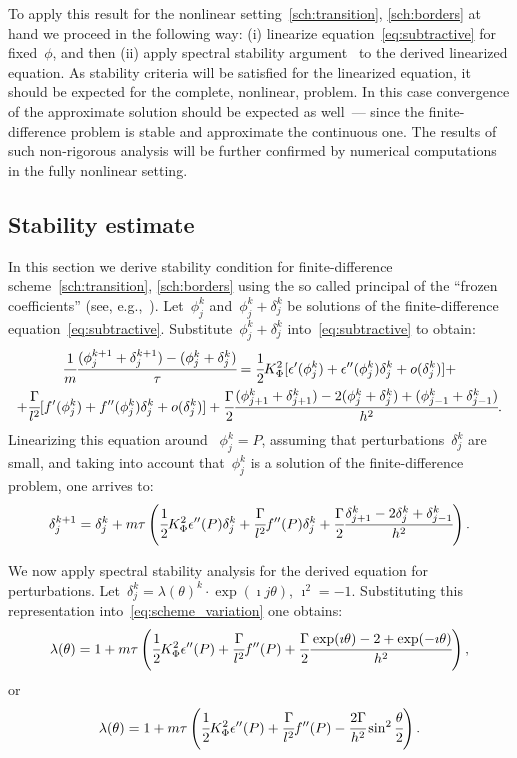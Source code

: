 To apply this result for the nonlinear setting~\eqref{sch:transition}, \eqref{sch:borders} at
hand we proceed in the following way:
(i) linearize equation~\eqref{eq:subtractive}
for fixed~$\phi$, and then (ii) apply spectral stability argument~\cite{bahvalov_computational_methods} to the
derived linearized equation. As stability criteria will be
satisfied for the linearized equation, it should be expected for the
complete, nonlinear, problem. In this case convergence of the
approximate solution should be expected as well~--- since
the finite-difference problem is stable and approximate the continuous
one.
The results of such non-rigorous analysis will be further confirmed by
numerical computations in the fully nonlinear setting.


\subsection{Stability estimate}

In this section we derive  stability condition for
finite-difference scheme~\eqref{sch:transition}, \eqref{sch:borders}
using the so called principal of the ``frozen coefficients''
(see, e.g.,~\cite{bahvalov_computational_methods}).
Let~$\phi_j^k$ and~$\phi_j^k + \delta_j^k$ be solutions of the
finite-difference equation~\eqref{eq:subtractive}.
Substitute~$\phi_j^k + \delta_j^k$ into~\eqref{eq:subtractive} to obtain:
\begin{multline*}
  \cfrac{1}{m} \cfrac{(\phi_j^{k + 1} + \delta_j^{k + 1}) - (\phi_j^k + \delta_j^k)}{\tau} = \cfrac{1}{2} K_\Phi^2 [\epsilon'(\phi_j^k) + \epsilon''(\phi_j^k) \delta_j^k + o(\delta_j^k)] + \\ + \cfrac{\Gamma}{l^2} [f'(\phi_j^k) + f''(\phi_j^k) \delta_j^k + o(\delta_j^k)] + \cfrac{\Gamma}{2} \cfrac{(\phi_{j + 1}^k + \delta_{j + 1}^k) - 2 (\phi_j^k + \delta_j^k) + (\phi_{j - 1}^k + \delta_{j - 1}^k)}{h^2} {\text{.}}
\end{multline*}
Linearizing this equation around~ $\phi_j^k = P$, assuming that
perturbations~$\delta_j^k$ are small, and taking into account
that~$\phi_j^k$ is a solution of the finite-difference problem, one
arrives to:
\begin{equation}
  \delta_j^{k + 1} = \delta_j^k + m \tau \left( \cfrac{1}{2} K_\Phi^2 \epsilon''(P) \delta_j^k + \cfrac{\Gamma}{l^2} f''(P) \delta_j^k + \cfrac{\Gamma}{2} \cfrac{{\delta}_{j + 1}^k - 2 {\delta}_j^k + {\delta}_{j - 1}^k}{h^2} \right) {\text{.}}
  \label{eq:scheme_variation}
\end{equation} 

We now apply spectral stability analysis for the derived equation for
perturbations.
Let~$\delta_j^k = \lambda(\theta)^k \cdot \exp(\imath j \theta)$, $\imath^2 = -1$.
Substituting this representation into~\eqref{eq:scheme_variation} one obtains:
$$\lambda(\theta) = 1 + m \tau \left( \cfrac{1}{2} K_\Phi^2 \epsilon''(P) + \cfrac{\Gamma}{l^2} f''(P) + \cfrac{\Gamma}{2} \cfrac{\exp(\imath \theta) - 2 + \exp(-\imath \theta)}{h^2} \right) {\text{,}}$$
or
\begin{equation}
  \lambda(\theta) = 1 + m \tau \left( \cfrac{1}{2} K_\Phi^2 \epsilon''(P) + \cfrac{\Gamma}{l^2} f''(P) - \cfrac{2 \Gamma}{h^2} \sin^2 \cfrac{\theta}{2} \right) {\text{.}}
  \label{eq:spectral}
\end{equation}

